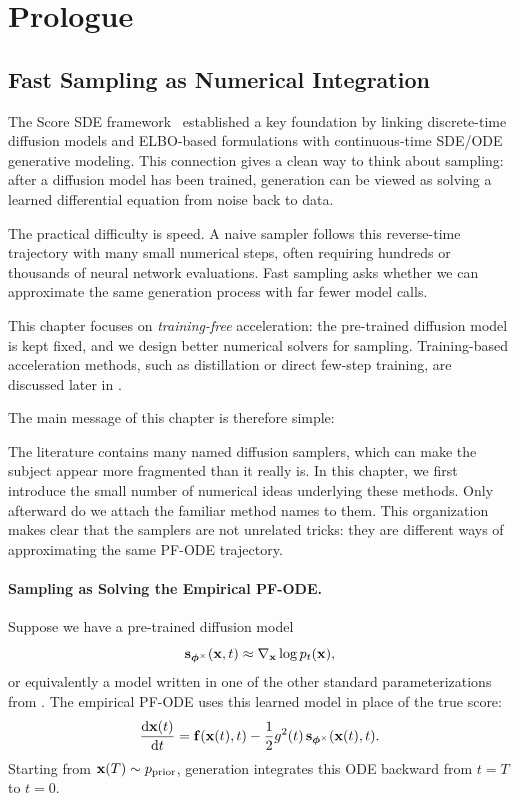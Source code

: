 \clearpage


\section{Prologue}\label{sec:prologue-solvers}
\subsection{Fast Sampling as Numerical Integration}

The Score SDE framework~\citep{song2020score} established a key foundation by
linking discrete-time diffusion models and ELBO-based formulations
\citep{sohl2015deep,ho2020denoising} with continuous-time SDE/ODE
generative modeling. This connection gives a clean way to think about sampling:
after a diffusion model has been trained, generation can be viewed as solving a
learned differential equation from noise back to data.

The practical difficulty is speed. A naive sampler follows this reverse-time
trajectory with many small numerical steps, often requiring hundreds or
thousands of neural network evaluations. Fast sampling asks whether we can
approximate the same generation process with far fewer model calls.

This chapter focuses on \emph{training-free} acceleration: the pre-trained
diffusion model is kept fixed, and we design better numerical solvers for
sampling. Training-based acceleration methods, such as distillation or direct
few-step training, are discussed later in
.

The main message of this chapter is therefore simple:

The literature contains many named diffusion samplers, which can make the
subject appear more fragmented than it really is. In this chapter, we first
introduce the small number of numerical ideas underlying these methods.
Only afterward do we attach the familiar method names to them. This
organization makes clear that the samplers are not unrelated tricks: they
are different ways of approximating the same PF-ODE trajectory.

\paragraph{Sampling as Solving the Empirical PF-ODE.}
Suppose we have a pre-trained diffusion model
\[
    {\mathbf{s}}_{\bm{\phi}^\times}({\mathbf{x}},t)
    \approx
    \nabla_{{\mathbf{x}}}\log p_t({\mathbf{x}}),
\]
or equivalently a model written in one of the other standard parameterizations
from . The empirical PF-ODE uses this
learned model in place of the true score:
\[
    \frac{\mathop{}\!\mathrm{d} {\mathbf{x}}(t)}{\mathop{}\!\mathrm{d} t}
    =
    {\mathbf{f}}({\mathbf{x}}(t),t)
    -
    \frac{1}{2}g^2(t)\,
    {\mathbf{s}}_{\bm{\phi}^\times}({\mathbf{x}}(t),t).
\]
Starting from ${\mathbf{x}}(T)\sim p_{\mathrm{prior}}$, generation integrates this
ODE backward from $t=T$ to $t=0$.


